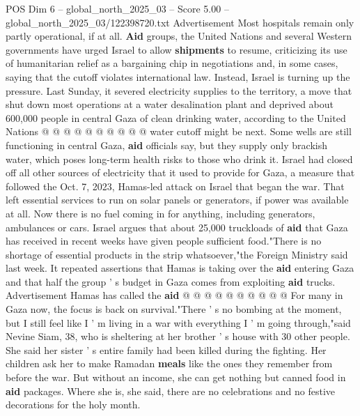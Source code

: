 \begin{textsample}{POS Dim 6 – global\_north\_2025\_03 – Score 5.00 – global\_north\_2025\_03/122398720.txt}
Advertisement Most hospitals remain only partly operational, if at all. \textbf{Aid} groups, the United Nations and several Western governments have urged Israel to allow \textbf{shipments} to resume, criticizing its use of humanitarian relief as a bargaining chip in negotiations and, in some cases, saying that the cutoff violates international law.
Instead, Israel is turning up the pressure.
Last Sunday, it severed electricity supplies to the territory, a move that shut down most operations at a water desalination plant and deprived about 600,000 people in central Gaza of clean drinking water, according to the United Nations @ @ @ @ @ @ @ @ @ @ water cutoff might be next.
Some wells are still functioning in central Gaza, \textbf{aid} officials say, but they supply only brackish water, which poses long-term health risks to those who drink it.
Israel had closed off all other sources of electricity that it used to provide for Gaza, a measure that followed the Oct. 7, 2023, Hamas-led attack on Israel that began the war.
That left essential services to run on solar panels or generators, if power was available at all.
Now there is no fuel coming in for anything, including generators, ambulances or cars.
Israel argues that about 25,000 truckloads of \textbf{aid} that Gaza has received in recent weeks have given people sufficient food."There is no shortage of essential products in the strip whatsoever,"the Foreign Ministry said last week.
It repeated assertions that Hamas is taking over the \textbf{aid} entering Gaza and that half the group ' s budget in Gaza comes from exploiting \textbf{aid} trucks.
Advertisement Hamas has called the \textbf{aid} @ @ @ @ @ @ @ @ @ @ For many in Gaza now, the focus is back on survival."There ' s no bombing at the moment, but I still feel like I ' m living in a war with everything I ' m going through,"said Nevine Siam, 38, who is sheltering at her brother ' s house with 30 other people.
She said her sister ' s entire family had been killed during the fighting.
Her children ask her to make Ramadan \textbf{meals} like the ones they remember from before the war.
But without an income, she can get nothing but canned food in \textbf{aid} packages.
Where she is, she said, there are no celebrations and no festive decorations for the holy month.

\end{textsample}
